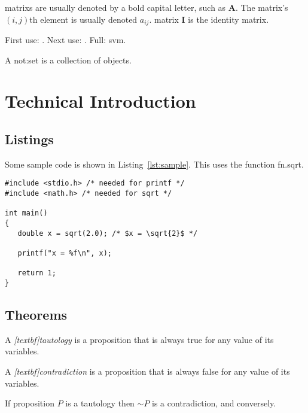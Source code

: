 \documentclass[oneside,12pt]{scrbook}
\theoremstyle{break}
\begin{document}
\Glspl{matrix} are usually denoted by a bold capital letter, such as
$\mathbf{A}$. The \gls{matrix}'s $(i,j)$th element is usually
denoted $a_{ij}$. \Gls{matrix} $\mathbf{I}$ is the identity
\gls{matrix}. 

First use: \@. Next use: \@. 
Full: \gls{svm}\@.

A \gls{not:set} is a collection of objects.

\chapter{Technical Introduction}
\label{ch:techintro}

\section{Listings}

Some sample code is shown in Listing~\ref{lst:sample}.  
This uses the function \gls{fn.sqrt}.

\begin{lstlisting}[mathescape=true,caption={Sample},label={lst:sample}]
#include <stdio.h> /* needed for printf */
#include <math.h> /* needed for sqrt */

int main()
{
   double x = sqrt(2.0); /* $x = \sqrt{2}$ */

   printf("x = %f\n", x);

   return 1;
}
\end{lstlisting} 

\section{Theorems}

\begin{Definition}[Tautology]
A \emph{\gls{[textbf]tautology}} is a proposition 
that is always true for any value of its variables.
\end{Definition}

\begin{Definition}[Contradiction]
A \emph{\gls{[textbf]contradiction}} is a 
proposition that is always false for any
value of its variables.
\end{Definition}

\begin{Theorem}
If proposition $P$ is a tautology
then $\sim P$ is a contradiction,
and conversely.
\end{Theorem}
\end{document}
